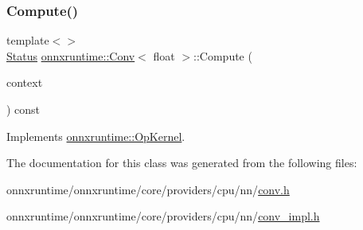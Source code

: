 \mbox{\label{classonnxruntime_1_1Conv_a6bce691672e1fff9c2806ecb325b15b6}} 
\subsubsection{\texorpdfstring{Compute()}{Compute()}\hspace{0.1cm}{\footnotesize\ttfamily [2/2]}}
{\footnotesize\ttfamily template$<$$>$ \\
\mbox{\hyperlink{classonnxruntime_1_1common_1_1Status}{Status}} \mbox{\hyperlink{classonnxruntime_1_1Conv}{onnxruntime\+::\+Conv}}$<$ float $>$\+::Compute (\begin{DoxyParamCaption}\item[{\mbox{\hyperlink{classonnxruntime_1_1OpKernelContext}{Op\+Kernel\+Context}} $\ast$}]{context }\end{DoxyParamCaption}) const\hspace{0.3cm}{\ttfamily [virtual]}}



Implements \mbox{\hyperlink{classonnxruntime_1_1OpKernel_a9eca8656a78b1b3ab9d3351a12798650}{onnxruntime\+::\+Op\+Kernel}}.



The documentation for this class was generated from the following files\+:\begin{DoxyCompactItemize}
\item 
onnxruntime/onnxruntime/core/providers/cpu/nn/\mbox{\hyperlink{cpu_2nn_2conv_8h}{conv.\+h}}\item 
onnxruntime/onnxruntime/core/providers/cpu/nn/\mbox{\hyperlink{conv__impl_8h}{conv\+\_\+impl.\+h}}\end{DoxyCompactItemize}
